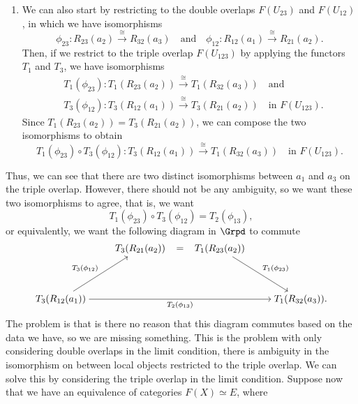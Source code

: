 \begin{answer}
\begin{enumerate}
        Then, if we restrict to the triple overlap $F(U_{123})$ by applying the functor $T_2$, we obtain an isomorphism
        $$
        T_2 (\phi_{13}): T_2(R_{13}(a_1)) \xrightarrow{\cong} T_2(R_{31}(a_3)) \quad \text{in } F(U_{123}).
        $$
        \item We can also start by restricting to the double overlaps $F(U_{23})$ and $F(U_{12})$, in which we have isomorphisms 
        $$
        \phi_{23}: R_{23}(a_2) \xrightarrow{\cong} R_{32}(a_3) \quad \text{and} \quad \phi_{12}: R_{12}(a_1) \xrightarrow{\cong} R_{21}(a_2).
        $$
        Then, if we restrict to the triple overlap $F(U_{123})$ by applying the functors $T_1$ and $T_3$, we have isomorphisms
        \begin{align*}
            &T_1 (\phi_{23}): T_1(R_{23}(a_2)) \xrightarrow{\cong} T_1(R_{32}(a_3)) \quad \text{and} \\
            &T_3 (\phi_{12}): T_3(R_{12}(a_1)) \xrightarrow{\cong} T_3(R_{21}(a_2)) \quad \text{in } F(U_{123}).
        \end{align*}
        Since $T_1(R_{23}(a_2)) = T_3(R_{21}(a_2))$, we can compose the two isomorphisms to obtain
        $$
        T_1 (\phi_{23}) \circ T_3 (\phi_{12}): T_3(R_{12}(a_1)) \xrightarrow{\cong} T_1(R_{32}(a_3))  \quad \text{in } F(U_{123}).
        $$
    \end{enumerate}
    Thus, we can see that there are two distinct isomorphisms between $a_1$ and $a_3$ on the triple overlap. However, there should not be any ambiguity, so we want these two isomorphisms to agree, that is, we want
    $$
    T_1 (\phi_{23}) \circ T_3 (\phi_{12}) = T_2 (\phi_{13}),
    $$
    or equivalently, we want the following diagram in $\Grpd$ to commute
    \[\begin{tikzcd}[cramped]
    	& {T_3(R_{21}(a_2))} & {T_1(R_{23}(a_2))} & \\
    	\\
    	{T_3(R_{12}(a_1))} &&& {T_1(R_{32}(a_3)).}
    	\arrow["{{=}}"{marking, allow upside down}, draw=none, from=1-2, to=1-3]
    	\arrow["{{T_1 (\phi_{23})}}", from=1-3, to=3-4]
    	\arrow["{{T_3 (\phi_{12})}}", from=3-1, to=1-2]
    	\arrow["{{T_2 (\phi_{13})}}"', from=3-1, to=3-4]
    \end{tikzcd}\]
    The problem is that is there no reason that this diagram commutes based on the data we have, so we are missing something. This is the problem with only considering double overlaps in the limit condition, there is ambiguity in the isomorphism on between local objects restricted to the triple overlap. We can solve this by considering the triple overlap in the limit condition. Suppose now that we have an equivalence of categories $F(X) \simeq E$, where

\end{answer}
